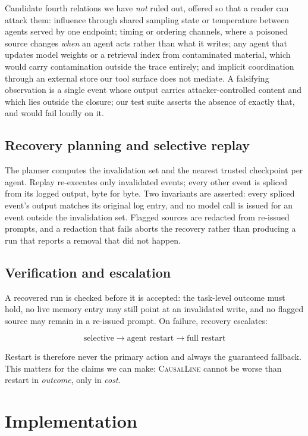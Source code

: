 \documentclass[10pt,twocolumn]{article}
\newcommand{\sys}{\textsc{CausalLine}}
\begin{document}
Candidate fourth relations we have \emph{not} ruled out, offered so that a
reader can attack them: influence through shared sampling state or temperature
between agents served by one endpoint; timing or ordering channels, where a
poisoned source changes \emph{when} an agent acts rather than what it writes;
any agent that updates model weights or a retrieval index from contaminated
material, which would carry contamination outside the trace entirely; and
implicit coordination through an external store our tool surface does not
mediate. A falsifying observation is a single event whose output carries
attacker-controlled content and which lies outside the closure; our test suite
asserts the absence of exactly that, and would fail loudly on it.

\subsection{Recovery planning and selective replay}

The planner computes the invalidation set and the nearest trusted checkpoint
per agent. Replay re-executes only invalidated events; every other event is
spliced from its logged output, byte for byte. Two invariants are asserted:
every spliced event's output matches its original log entry, and no model call
is issued for an event outside the invalidation set. Flagged sources are
redacted from re-issued prompts, and a redaction that fails aborts the
recovery rather than producing a run that reports a removal that did not
happen.

\subsection{Verification and escalation}
\label{sec:verify}

A recovered run is checked before it is accepted: the task-level outcome must
hold, no live memory entry may still point at an invalidated write, and no
flagged source may remain in a re-issued prompt. On failure, recovery escalates:

\[
\text{selective} \rightarrow \text{agent restart} \rightarrow \text{full restart}
\]

Restart is therefore never the primary action and always the guaranteed
fallback. This matters for the claims we can make: \sys{} cannot be worse than
restart in \emph{outcome}, only in \emph{cost}.

\section{Implementation}
\end{document}

